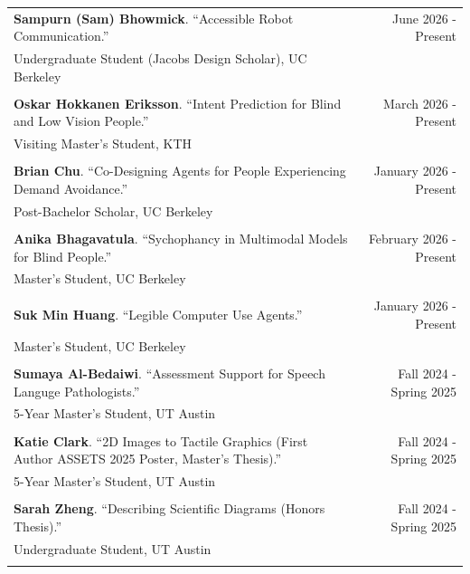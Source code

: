 \begin{longtable}{Xr}
	\textbf{Sampurn (Sam) Bhowmick}. ``Accessible Robot Communication.'' & June 2026 - Present \\
	Undergraduate Student (Jacobs Design Scholar), UC Berkeley &  \\
	\\

	\textbf{Oskar Hokkanen Eriksson}. ``Intent Prediction for Blind and Low Vision People.'' & March 2026 - Present \\
	Visiting Master's Student, KTH &  \\
	\\

	\textbf{Brian Chu}. ``Co-Designing Agents for People Experiencing Demand Avoidance.'' & January 2026 - Present \\
	Post-Bachelor Scholar, UC Berkeley &  \\
	\\

	\textbf{Anika Bhagavatula}. ``Sychophancy in Multimodal Models for Blind People.'' & February 2026 - Present \\
	Master's Student, UC Berkeley &  \\
	\\

	\textbf{Suk Min Huang}. ``Legible Computer Use Agents.'' & January 2026 - Present \\
	Master's Student, UC Berkeley &  \\
	\\

	\textbf{Sumaya Al-Bedaiwi}. ``Assessment Support for Speech Languge Pathologists.'' & Fall 2024 - Spring 2025 \\
	5-Year Master's Student, UT Austin &  \\
	\\

	\textbf{Katie Clark}. ``2D Images to Tactile Graphics (First Author ASSETS 2025 Poster, Master's Thesis).'' & Fall 2024 - Spring 2025 \\
	5-Year Master's Student, UT Austin &  \\
	\\

	\textbf{Sarah Zheng}. ``Describing Scientific Diagrams (Honors Thesis).'' & Fall 2024 - Spring 2025 \\
	Undergraduate Student, UT Austin &  \\
	\\


\end{longtable}
